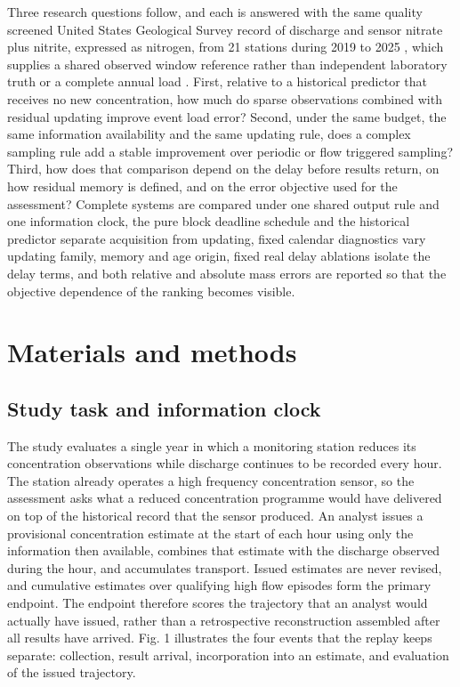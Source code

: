 \documentclass[pdflatex,sn-mathphys-num]{sn-jnl}%
\theoremstyle{thmstyleone}%
\theoremstyle{thmstyletwo}%
\theoremstyle{thmstylethree}%
\begin{document}
Three research questions follow, and each is answered with the same quality screened United States Geological Survey record of discharge and sensor nitrate plus nitrite, expressed as nitrogen, from 21 stations during 2019 to 2025 \citep{usgs2026}, which supplies a shared observed window reference rather than independent laboratory truth or a complete annual load \citep{pellerin2013}. First, relative to a historical predictor that receives no new concentration, how much do sparse observations combined with residual updating improve event load error? Second, under the same budget, the same information availability and the same updating rule, does a complex sampling rule add a stable improvement over periodic or flow triggered sampling? Third, how does that comparison depend on the delay before results return, on how residual memory is defined, and on the error objective used for the assessment? Complete systems are compared under one shared output rule and one information clock, the pure block deadline schedule and the historical predictor separate acquisition from updating, fixed calendar diagnostics vary updating family, memory and age origin, fixed real delay ablations isolate the delay terms, and both relative and absolute mass errors are reported so that the objective dependence of the ranking becomes visible.

\section{Materials and methods}\label{sec:materialsandmethod}

\subsection{Study task and information clock}

The study evaluates a single year in which a monitoring station reduces its concentration observations while discharge continues to be recorded every hour. The station already operates a high frequency concentration sensor, so the assessment asks what a reduced concentration programme would have delivered on top of the historical record that the sensor produced. An analyst issues a provisional concentration estimate at the start of each hour using only the information then available, combines that estimate with the discharge observed during the hour, and accumulates transport. Issued estimates are never revised, and cumulative estimates over qualifying high flow episodes form the primary endpoint. The endpoint therefore scores the trajectory that an analyst would actually have issued, rather than a retrospective reconstruction assembled after all results have arrived. Fig. 1 illustrates the four events that the replay keeps separate: collection, result arrival, incorporation into an estimate, and evaluation of the issued trajectory.
\end{document}
